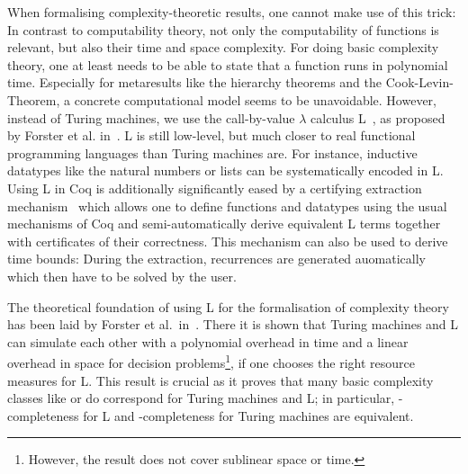 When formalising complexity-theoretic results, one cannot make use of this trick: In contrast to computability theory, not only the computability of functions is relevant, but also their time and space complexity. For doing basic complexity theory, one at least needs to be able to state that a function runs in polynomial time.
Especially for metaresults like the hierarchy theorems and the Cook-Levin-Theorem, a concrete computational model seems to be unavoidable.
However, instead of Turing machines, we use the call-by-value $\lambda$ calculus L~\cite{ForsterSmolka:2017:L-Computability}, as proposed by Forster et al. in~\cite{ForsterEtAl:2019:VerifiedTMs}. L is still low-level, but much closer to real functional programming languages than Turing machines are. For instance, inductive datatypes like the natural numbers or lists can be systematically encoded in L.
Using L in Coq is additionally significantly eased by a certifying extraction mechanism~\cite{ForsterKunze:2019:Certifying-extraction} which allows one to define functions and datatypes using the usual mechanisms of Coq and semi-automatically derive equivalent L terms together with certificates of their correctness. This mechanism can also be used to derive time bounds: During the extraction, recurrences are generated auomatically which then have to be solved by the user. 

The theoretical foundation of using L for the formalisation of complexity theory has been laid by Forster et al.\ in~\cite{ForsterKunzeRoth:2019:wcbv-Reasonable}. There it is shown that Turing machines and L can simulate each other with a polynomial overhead in time and a linear overhead in space for decision problems\footnote{However, the result does not cover sublinear space or time.}, if one chooses the right resource measures for L.
This result is crucial as it proves that many basic complexity classes like \NP{} or \PC{} do correspond for Turing machines and L; in particular, \NP{}-completeness for L and \NP{}-completeness for Turing machines are equivalent.


